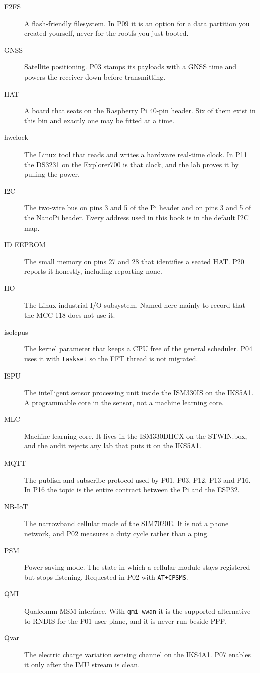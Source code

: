 \begin{description}
\item[F2FS] A flash-friendly filesystem. In P09 it is an option for a data partition you created yourself, never for the rootfs you just booted.
\item[GNSS] Satellite positioning. P03 stamps its payloads with a GNSS time and powers the receiver down before transmitting.
\item[HAT] A board that seats on the Raspberry Pi 40-pin header. Six of them exist in this bin and exactly one may be fitted at a time.
\item[hwclock] The Linux tool that reads and writes a hardware real-time clock. In P11 the DS3231 on the Explorer700 is that clock, and the lab proves it by pulling the power.
\item[I2C] The two-wire bus on pins 3 and 5 of the Pi header and on pins 3 and 5 of the NanoPi header. Every address used in this book is in the default I2C map.
\item[ID EEPROM] The small memory on pins 27 and 28 that identifies a seated HAT. P20 reports it honestly, including reporting none.
\item[IIO] The Linux industrial I/O subsystem. Named here mainly to record that the MCC 118 does not use it.
\item[isolcpus] The kernel parameter that keeps a CPU free of the general scheduler. P04 uses it with \texttt{taskset} so the FFT thread is not migrated.
\item[ISPU] The intelligent sensor processing unit inside the ISM330IS on the IKS5A1. A programmable core in the sensor, not a machine learning core.
\item[MLC] Machine learning core. It lives in the ISM330DHCX on the STWIN.box, and the audit rejects any lab that puts it on the IKS5A1.
\item[MQTT] The publish and subscribe protocol used by P01, P03, P12, P13 and P16. In P16 the topic is the entire contract between the Pi and the ESP32.
\item[NB-IoT] The narrowband cellular mode of the SIM7020E. It is not a phone network, and P02 measures a duty cycle rather than a ping.
\item[PSM] Power saving mode. The state in which a cellular module stays registered but stops listening. Requested in P02 with \texttt{AT+CPSMS}.
\item[QMI] Qualcomm MSM interface. With \texttt{qmi\_wwan} it is the supported alternative to RNDIS for the P01 user plane, and it is never run beside PPP.
\item[Qvar] The electric charge variation sensing channel on the IKS4A1. P07 enables it only after the IMU stream is clean.

\end{description}
